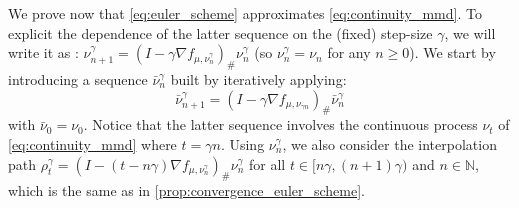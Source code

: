 We  prove now that \cref{eq:euler_scheme} approximates \cref{eq:continuity_mmd}. To explicit the dependence of the latter sequence on the (fixed) step-size $\gamma$, we will write it as : $\nu_{n+1}^{\gamma} =(I-\gamma\nabla f_{\mu,\nu_n^{\gamma}})_{\#}\nu_{n}^{\gamma}$ (so $\nu_n^{\gamma}=\nu_n$ for any $n \ge 0$). We start by introducing a sequence $\bar{\nu}_{n}^{\gamma}$ built by iteratively applying: 
 \begin{equation}\label{eq:intermed_process_time}
 \bar{\nu}_{n+1}^{\gamma} =(I-\gamma\nabla f_{\mu,\nu_{\gamma n}})_{\#}\bar{\nu}_{n}^{\gamma}
  \end{equation}
 with $\bar{\nu}_{0}=\nu_{0}$. Notice that the latter sequence involves the continuous process $\nu_t$ of \eqref{eq:continuity_mmd} where $t=\gamma n$. Using $\nu_n^{\gamma}$, we also consider the interpolation path $\rho_{t}^{\gamma}=(I-(t-n\gamma)\nabla f_{\mu,\nu_{n}^{\gamma}})_{\#}\nu_{n}^{\gamma}$ for all $t\in[n\gamma,(n+1)\gamma)$ and $n\in \mathbb{N}$, which is the same as in \cref{prop:convergence_euler_scheme}.
